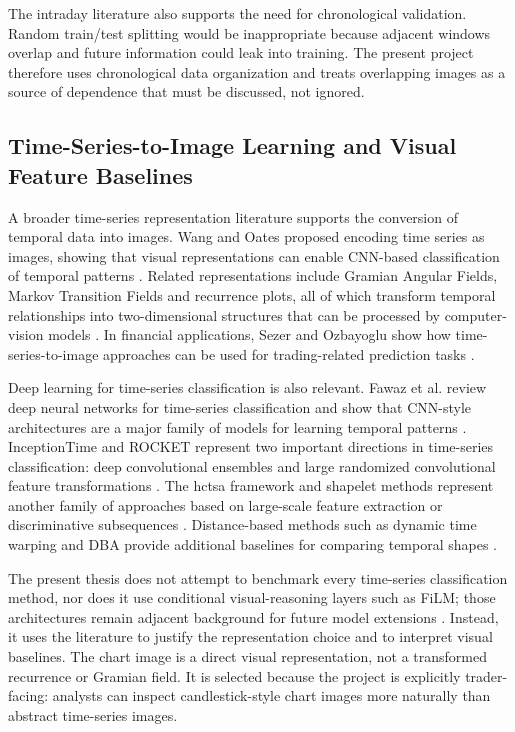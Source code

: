 The intraday literature also supports the need for chronological validation. Random train/test splitting would be inappropriate because adjacent windows overlap and future information could leak into training. The present project therefore uses chronological data organization and treats overlapping images as a source of dependence that must be discussed, not ignored.

\subsection{Time-Series-to-Image Learning and Visual Feature Baselines}
\label{subsec:tsi_visual_baselines}

A broader time-series representation literature supports the conversion of temporal data into images. Wang and Oates proposed encoding time series as images, showing that visual representations can enable CNN-based classification of temporal patterns \cite{wang_oates_imaging_time_series}. Related representations include Gramian Angular Fields, Markov Transition Fields and recurrence plots, all of which transform temporal relationships into two-dimensional structures that can be processed by computer-vision models \cite{recurrence_plots,gramian_fields}. In financial applications, Sezer and Ozbayoglu show how time-series-to-image approaches can be used for trading-related prediction tasks \cite{sezer_ozbayoglu_tsi}.

Deep learning for time-series classification is also relevant. Fawaz et al. review deep neural networks for time-series classification and show that CNN-style architectures are a major family of models for learning temporal patterns \cite{fawaz_tsc_review}. InceptionTime and ROCKET represent two important directions in time-series classification: deep convolutional ensembles and large randomized convolutional feature transformations \cite{inceptiontime,rocket}. The hctsa framework and shapelet methods represent another family of approaches based on large-scale feature extraction or discriminative subsequences \cite{hctsa,shapelets,learning_shapelets,random_dilated_shapelets}. Distance-based methods such as dynamic time warping and DBA provide additional baselines for comparing temporal shapes \cite{dtw,dba}.

The present thesis does not attempt to benchmark every time-series classification method, nor does it use conditional visual-reasoning layers such as FiLM; those architectures remain adjacent background for future model extensions \cite{perez_film}. Instead, it uses the literature to justify the representation choice and to interpret visual baselines. The chart image is a direct visual representation, not a transformed recurrence or Gramian field. It is selected because the project is explicitly trader-facing: analysts can inspect candlestick-style chart images more naturally than abstract time-series images.

